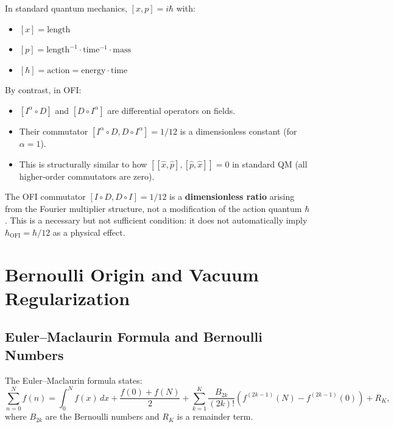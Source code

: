\documentclass[12pt]{article}
\theoremstyle{definition}
\begin{document}
In standard quantum mechanics, $[x, p] = i\hbar$ with:
\begin{itemize}
  \item $[x] = \mathrm{length}$
  \item $[p] = \mathrm{length}^{-1} \cdot \mathrm{time}^{-1} \cdot \mathrm{mass}$
  \item $[\hbar] = \mathrm{action} = \mathrm{energy} \cdot \mathrm{time}$
\end{itemize}

By contrast, in OFI:
\begin{itemize}
  \item $[I^\alpha\circ D]$ and $[D\circ I^\alpha]$ are differential operators on fields.
  \item Their commutator $[I^\alpha\circ D, D\circ I^\alpha] = 1/12$ is a dimensionless
    constant (for $\alpha=1$).
  \item This is structurally similar to how $[[\hat{x}, \hat{p}], [\hat{p}, \hat{x}]] = 0$
    in standard QM (all higher-order commutators are zero).
\end{itemize}

\begin{tcolorbox}[resultbox, title=Key Result: Dimensionless vs.\ Action]
The OFI commutator $[I\circ D, D\circ I] = 1/12$ is a \textbf{dimensionless ratio}
arising from the Fourier multiplier structure, not a modification of the action quantum $\hbar$.
This is a necessary but not sufficient condition: it does not automatically imply
$\hbar_{\mathrm{OFI}} = \hbar/12$ as a physical effect.
\end{tcolorbox}

\section{Bernoulli Origin and Vacuum Regularization}
\label{sec:bernoulli}

\subsection{Euler--Maclaurin Formula and Bernoulli Numbers}

The Euler--Maclaurin formula states:
\begin{equation}
  \sum_{n=0}^{N} f(n) = \int_0^N f(x)\,dx + \frac{f(0) + f(N)}{2}
  + \sum_{k=1}^{K} \frac{B_{2k}}{(2k)!}\left(f^{(2k-1)}(N) - f^{(2k-1)}(0)\right) + R_K,
  \label{eq:euler-maclaurin}
\end{equation}
where $B_{2k}$ are the Bernoulli numbers and $R_K$ is a remainder term.
\end{document}
